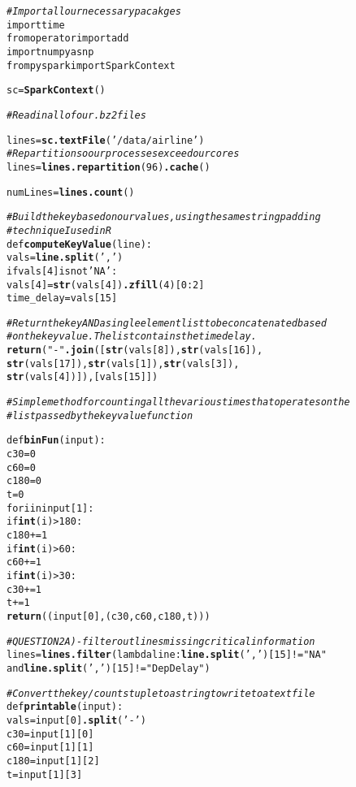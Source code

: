\documentclass{article}\usepackage[]{graphicx}\usepackage[]{color}
\makeatletter
\newcommand{\hlstr}[1]{\textcolor[rgb]{0.192,0.494,0.8}{#1}}%
\newcommand{\hlcom}[1]{\textcolor[rgb]{0.678,0.584,0.686}{\textit{#1}}}%
\newcommand{\hlkwd}[1]{\textcolor[rgb]{0.737,0.353,0.396}{\textbf{#1}}}%
\newenvironment{kframe}{%
 \def\at@end@of@kframe{}%
 \ifinner\ifhmode%
  \def\at@end@of@kframe{\end{minipage}}%
  \begin{minipage}{\columnwidth}%
 \fi\fi%
 \def\FrameCommand##1{\hskip\@totalleftmargin \hskip-\fboxsep
 \colorbox{shadecolor}{##1}\hskip-\fboxsep
     \hskip-\linewidth \hskip-\@totalleftmargin \hskip\columnwidth}%
 \MakeFramed {\advance\hsize-\width
   \@totalleftmargin\z@ \linewidth\hsize
   \@setminipage}}%
 {\par\unskip\endMakeFramed%
 \at@end@of@kframe}
\newenvironment{knitrout}{}{} %
\makeatother
\begin{document}
\begin{knitrout}
\color{fgcolor}\begin{kframe}
\begin{alltt}
\hlcom{# Import all our necessary pacakges}
import time
from operator import add
import numpy as np
from pyspark import SparkContext

sc = \hlkwd{SparkContext}()

\hlcom{# Read in all of our .bz2 files}

lines = \hlkwd{sc.textFile}(\hlstr{'/data/airline'})
\hlcom{# Repartition so our processes exceed our cores}
lines = \hlkwd{lines.repartition}(96)\hlkwd{.cache}()

numLines = \hlkwd{lines.count}()

\hlcom{# Build the key based on our values, using the same string padding}
\hlcom{# technique I used in R}
def \hlkwd{computeKeyValue}(line):
    vals = \hlkwd{line.split}(\hlstr{','})
    if vals[4] is not \hlstr{'NA'}:
        vals[4] = \hlkwd{str}(vals[4])\hlkwd{.zfill}(4)[0:2]
    time_delay = vals[15]

\hlcom{# Return the key AND a single element list to be concatenated based}
\hlcom{# on the key value.  The list contains the time delay.}
    \hlkwd{return}(\hlstr{"-"}\hlkwd{.join}([\hlkwd{str}(vals[8]), \hlkwd{str}(vals[16]), 
                     \hlkwd{str}(vals[17]), \hlkwd{str}(vals[1]),\hlkwd{str}(vals[3]), 
                     \hlkwd{str}(vals[4])]),[vals[15]])

\hlcom{# Simple method for counting all the various times that operates on the}
\hlcom{# list passed by the key value function}
    
def \hlkwd{binFun}(input):
    c30 = 0
    c60 = 0
    c180 = 0
    t = 0
    for i in input[1]:
        if \hlkwd{int}(i) > 180:
            c180 += 1
        if \hlkwd{int}(i) > 60:
            c60 += 1
        if \hlkwd{int}(i) > 30:
            c30 += 1
        t += 1
    \hlkwd{return}((input[0],( c30, c60, c180, t)))

\hlcom{# QUESTION 2A) - filter out lines missing critical information}
lines = \hlkwd{lines.filter}(lambda line: \hlkwd{line.split}(\hlstr{','})[15] != \hlstr{"NA"} 
                     and \hlkwd{line.split}(\hlstr{','})[15] != \hlstr{"DepDelay"})

\hlcom{# Convert the key/counts tuple to a string to write to a text file}
def \hlkwd{printable}(input):
    vals = input[0]\hlkwd{.split}(\hlstr{'-'})
    c30  = input[1][0]
    c60  = input[1][1]
    c180 = input[1][2]
    t    = input[1][3]


\end{alltt}
\end{kframe}
\end{knitrout}
\end{document}
